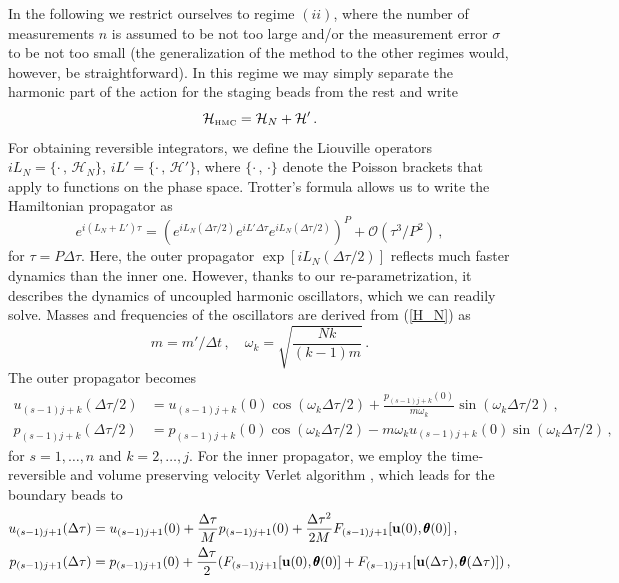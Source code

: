\documentclass[11pt]{article}
\newcommand{\vc}[1]{{\bf #1 }}
\theoremstyle{definition}
\begin{document}
In the following we restrict ourselves to regime $(ii)$, where the number of measurements $n$ is assumed to be not too large and/or the measurement error $\sigma$ to be not too small (the generalization of the method to the other regimes would, however, be straightforward). In this regime we may simply separate the harmonic part of the action for the staging beads from the rest and write
\begin{equation}
  \mathcal{H}_{\mbox{\tiny HMC}}=\mathcal H_N + \mathcal H'\,.
\end{equation}
For obtaining reversible integrators, we define the Liouville operators
$ iL_N=\{\cdot\,,\,\mathcal H_N\}$, $iL'=\{\cdot\,,\,\mathcal H'\}$,
where $\{\cdot\,,\,\cdot\}$ denote the Poisson brackets that apply to functions on the phase space.
Trotter's formula \cite{trotter_1959} allows us to write the Hamiltonian propagator as
\begin{equation}\label{propagator}
  e^{i(L_N+L')\tau}
  =
  (e^{iL_N(\Delta\tau/2)}e^{iL'\Delta\tau}e^{iL_N(\Delta\tau/2)})^P
  +
  \mathcal O(\tau^3/P^{2})\,,
\end{equation}
for $\tau =P\Delta \tau$.
Here, the outer propagator $\exp[iL_N(\Delta \tau/2)]$ reflects much faster dynamics than the inner one.
However, thanks to our re-parametrization, it describes the dynamics of uncoupled harmonic oscillators, which we can readily solve.
Masses and frequencies of the oscillators are derived from (\ref{H_N}) as
\begin{equation}
  m=m'/\Delta t\,,\quad
  \omega_k=\sqrt{\frac{Nk}{(k-1)m}}\,.
\end{equation}
The outer propagator becomes
\begin{align}
  u_{(s-1)j+k}(\Delta\tau/2)
  &=
  u_{(s-1)j+k}(0)\cos(\omega_k\Delta\tau/2)
  +
  \frac{p_{(s-1)j+k}(0)}{m\omega_k}\sin(\omega_k\Delta\tau/2)\,,\label{analytical1}
  \\
  p_{(s-1)j+k}(\Delta\tau/2)
  &=
  p_{(s-1)j+k}(0)\cos(\omega_k\Delta\tau/2)
  -
  m\omega_k u_{(s-1)j+k}(0) \sin(\omega_k\Delta\tau/2)\,,\label{analytical2}
\end{align}
for $s=1,\dots,n$ and $k=2,\dots,j$.
For the inner propagator, we employ the time-reversible and volume preserving velocity Verlet algorithm \cite{swope_1982_verlet}, which leads for the boundary beads to
\begin{align}
  u_{(s-1)j+1}(\Delta\tau)
  &= u_{(s-1)j+1}(0)
  +
  \frac{\Delta\tau}{M} p_{(s-1)j+1}(0)
  +
  \frac{\Delta \tau^2}{2M}
  F_{(s-1)j+1}[\vc u(0),{\pmb\theta}(0)]\,,\\
  p_{(s-1)j+1}(\Delta\tau)
  &= p_{(s-1)j+1}(0)
  +
  \frac{\Delta\tau}{2}
  (
  F_{(s-1)j+1}[\vc u(0),{\pmb\theta}(0)]
  +
  F_{(s-1)j+1}[\vc u(\Delta\tau),{\pmb\theta}(\Delta\tau)]
  )\,,
\end{align}
\end{document}
